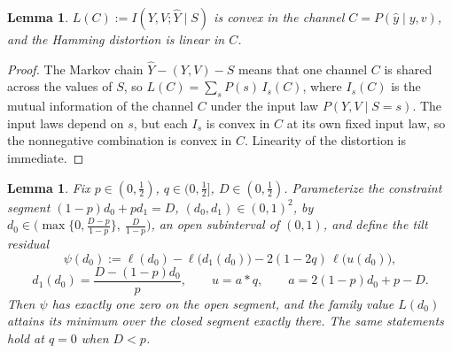 \documentclass[11pt,onecolumn]{IEEEtran}
\newtheorem{lemma}[theorem]{Lemma}
\newcommand{\hY}{\widehat{Y}}
\begin{document}
\begin{lemma}\label{lem:binconvex}
$L(C):=I(Y,V;\hY\mid S)$ is convex in the channel
$C=P(\hat y\mid y,v)$, and the Hamming distortion is linear in $C$.
\end{lemma}

\begin{proof}
The Markov chain $\hY-(Y,V)-S$ means that one channel $C$ is shared
across the values of $S$, so $L(C)=\sum_sP(s)\,I_s(C)$, where $I_s(C)$
is the mutual information of the channel $C$ under the input law
$P(Y,V\mid S=s)$. The input laws depend on $s$, but each $I_s$ is
convex in $C$ at its own fixed input law, so the nonnegative
combination is convex in $C$. Linearity of the distortion is immediate.
\end{proof}

\begin{lemma}
\label{lem:tiltroot}
Fix $p\in(0,\tfrac12)$, $q\in(0,\tfrac12]$, $D\in(0,\tfrac12)$.
Parameterize the constraint segment $(1-p)d_0+pd_1=D$,
$(d_0,d_1)\in(0,1)^2$, by
$d_0\in\bigl(\max\{0,\tfrac{D-p}{1-p}\},\ \tfrac{D}{1-p}\bigr)$, an
open subinterval of $(0,1)$, and define the tilt residual
\[
\psi(d_0):=\ell(d_0)-\ell\bigl(d_1(d_0)\bigr)
-2(1-2q)\,\ell\bigl(u(d_0)\bigr),
\]
\[
d_1(d_0)=\frac{D-(1-p)d_0}{p},\qquad
u=a*q,\qquad a=2(1-p)d_0+p-D .
\]
Then $\psi$ has exactly one zero on the open segment, and the family
value $L(d_0)$ attains its minimum over the closed segment exactly
there. The same statements hold at $q=0$ when $D<p$.
\end{lemma}
\end{document}
